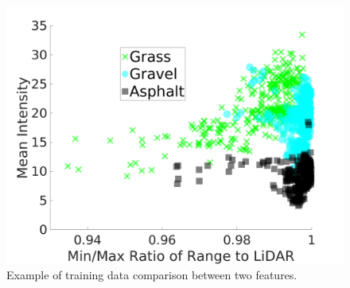 \documentclass[journal,onecolumn]{IEEEtran}
\begin{document}

			\begin{figure}[H]
			\centering
			\includegraphics[width=0.75\linewidth]{figures/training_data_cluster_5}
			\caption[Example Clustering]{Example of training data comparison between two features.}
			\label{fig:training_data_cluster_2}
			\end{figure}
	
\end{document}
